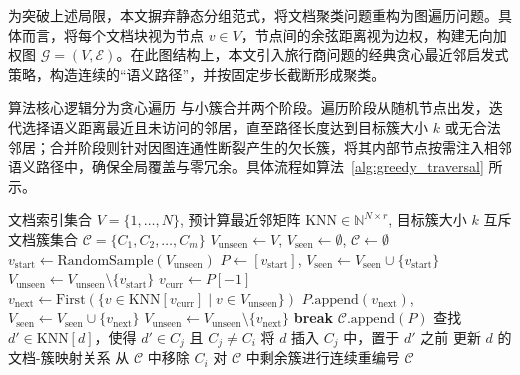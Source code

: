 为突破上述局限，本文摒弃静态分组范式，将文档聚类问题重构为图遍历问题。具体而言，将每个文档块视为节点 $v \in V$，节点间的余弦距离视为边权，构建无向加权图 $\mathcal{G}=(V, \mathcal{E})$。在此图结构上，本文引入旅行商问题的经典贪心最近邻启发式策略，构造连续的“语义路径”，并按固定步长截断形成聚类。



算法核心逻辑分为贪心遍历 与小簇合并两个阶段。遍历阶段从随机节点出发，迭代选择语义距离最近且未访问的邻居，直至路径长度达到目标簇大小 $k$ 或无合法邻居；合并阶段则针对因图连通性断裂产生的欠长簇，将其内部节点按需注入相邻语义路径中，确保全局覆盖与零冗余。具体流程如算法~\ref{alg:greedy_traversal} 所示。



\begin{algorithm}[!ht]
\caption{贪心遍历聚类与簇合并算法}
\label{alg:greedy_traversal}
\begin{algorithmic}[1]
\Require 文档索引集合 $V = \{1, \dots, N\}$, 预计算最近邻矩阵 $\text{KNN} \in \mathbb{N}^{N \times r}$, 目标簇大小 $k$
\Ensure 互斥文档簇集合 $\mathcal{C} = \{C_1, C_2, \dots, C_m\}$
\State $V_{\text{unseen}} \gets V$, $V_{\text{seen}} \gets \emptyset$, $\mathcal{C} \gets \emptyset$
 
    \State $v_{\text{start}} \gets \text{RandomSample}(V_{\text{unseen}})$
    \State $P \gets [v_{\text{start}}]$, $V_{\text{seen}} \gets V_{\text{seen}} \cup \{v_{\text{start}}\}$
    \State $V_{\text{unseen}} \gets V_{\text{unseen}} \setminus \{v_{\text{start}}\}$
        \State $v_{\text{curr}} \gets P[-1]$
        \State $v_{\text{next}} \gets \text{First}(\{v \in \text{KNN}[v_{\text{curr}}] \mid v \in V_{\text{unseen}}\})$
            \State $P.\text{append}(v_{\text{next}})$, $V_{\text{seen}} \gets V_{\text{seen}} \cup \{v_{\text{next}}\}$
            \State $V_{\text{unseen}} \gets V_{\text{unseen}} \setminus \{v_{\text{next}}\}$
        \Else
            \State \textbf{break} 
        \EndIf
    \EndWhile
    \State $\mathcal{C}.\text{append}(P)$
\EndWhile
\State {}
        \State 查找 $d' \in \text{KNN}[d]$，使得 $d' \in C_j$ 且 $C_j \neq C_i$
            \State 将 $d$ 插入 $C_j$ 中，置于 $d'$ 之前
            \State 更新 $d$ 的文档-簇映射关系
        \EndIf
    \EndFor
    \State 从 $\mathcal{C}$ 中移除 $C_i$
\EndFor
\State 对 $\mathcal{C}$ 中剩余簇进行连续重编号
\State \Return $\mathcal{C}$
\end{algorithmic}
\end{algorithm}



